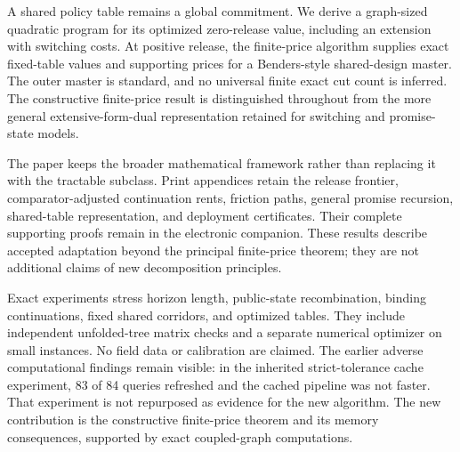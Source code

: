 A shared policy table remains a global commitment. We derive a graph-sized quadratic program for its optimized zero-release value, including an extension with switching costs. At positive release, the finite-price algorithm supplies exact fixed-table values and supporting prices for a Benders-style shared-design master. The outer master is standard, and no universal finite exact cut count is inferred. The constructive finite-price result is distinguished throughout from the more general extensive-form-dual representation retained for switching and promise-state models.

The paper keeps the broader mathematical framework rather than replacing it with the tractable subclass. Print appendices retain the release frontier, comparator-adjusted continuation rents, friction paths, general promise recursion, shared-table representation, and deployment certificates. Their complete supporting proofs remain in the electronic companion. These results describe accepted adaptation beyond the principal finite-price theorem; they are not additional claims of new decomposition principles.

Exact experiments stress horizon length, public-state recombination, binding continuations, fixed shared corridors, and optimized tables. They include independent unfolded-tree matrix checks and a separate numerical optimizer on small instances. No field data or calibration are claimed. The earlier adverse computational findings remain visible: in the inherited strict-tolerance cache experiment, 83 of 84 queries refreshed and the cached pipeline was not faster. That experiment is not repurposed as evidence for the new algorithm. The new contribution is the constructive finite-price theorem and its memory consequences, supported by exact coupled-graph computations.

